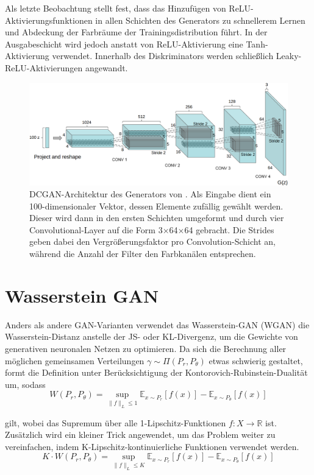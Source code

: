 Als letzte Beobachtung stellt \cite{radford2016unsupervised} fest, dass das
Hinzufügen von ReLU-Ak\-ti\-vier\-ungs\-funk\-tio\-nen in allen Schichten des
Generators zu schnellerem Lernen und Abdeckung der Farbräume der
Trainingsdistribution führt. In der Ausgabeschicht wird jedoch anstatt von
ReLU-Aktivierung eine Tanh-Aktivierung verwendet. Innerhalb des Diskriminators
werden schließlich Leaky-ReLU-Aktivierungen angewandt.

\begin{figure}
\includegraphics[width=\textwidth]{images/dcgan-architecture}
\caption{DCGAN-Architektur des Generators von
\cite{radford2016unsupervised}. Als Eingabe dient ein 100-dimensionaler
Vektor, dessen Elemente zufällig gewählt werden. Dieser wird dann in den
ersten Schichten umgeformt und durch vier Convolutional-Layer auf die Form
3$\times$64$\times$64 gebracht. Die Strides geben dabei den
Vergrößerungsfaktor pro Convolution-Schicht an, während die Anzahl der
Filter den Farbkanälen entsprechen.}
\end{figure}

\section{Wasserstein GAN}
Anders als andere GAN-Varianten verwendet das Wasserstein-GAN (WGAN) die
Was\-ser\-stein-Distanz anstelle der JS- oder KL-Divergenz, um die Gewichte
von generativen neuronalen Netzen zu optimieren. Da sich die Berechnung aller
möglichen gemeinsamen Verteilungen $\gamma \sim \Pi(P_r, P_\theta)$ etwas schwierig
gestaltet, formt \cite{arjovsky2017wasserstein} die Definition unter
Berücksichtigung der Kontorovich-Rubinstein-Dualität um, sodass
\[
W(P_r, P_\theta) = \sup_{\|f\|_L \leq 1} \mathbb{E}_{x \sim P_r}\left[f(x)\right] - \mathbb{E}_{x \sim P_\theta}\left[f(x)\right]
\]

gilt, wobei das Supremum über alle 1-Lipschitz-Funktionen $f : X \to
\mathbb{R}$ ist. Zusätzlich wird ein kleiner Trick angewendet, um das Problem
weiter zu vereinfachen, indem K-Lipschitz-kontinuierliche Funktionen verwendet
werden.
\[
K \cdot W(P_r, P_\theta) = \sup_{\|f\|_L \leq K} \mathbb{E}_{x \sim P_r}\left[f(x)\right] - \mathbb{E}_{x \sim P_\theta}\left[f(x)\right]
\]

